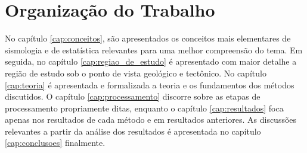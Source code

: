 \section{Organização do Trabalho}
\label{sec:organizacao_trabalho}

No capítulo \ref{cap:conceitos}, são apresentados os conceitos mais elementares
de sismologia e de estatística relevantes para uma melhor compreensão do tema.
Em seguida, no capítulo \ref{cap:regiao_de_estudo} é apresentado com maior detalhe
a região de estudo sob o ponto de vista geológico e tectônico. No capítulo \ref{cap:teoria}
é apresentada e formalizada a teoria e os fundamentos dos métodos discutidos. O capítulo \ref{cap:processamento}
discorre sobre as etapas de processamento propriamente ditas, enquanto o capítulo \ref{cap:resultados}
foca apenas nos resultados de cada método e em resultados anteriores. As discussões relevantes a partir da análise
dos resultados é apresentada no capítulo \ref{cap:conclusoes} finalmente.
